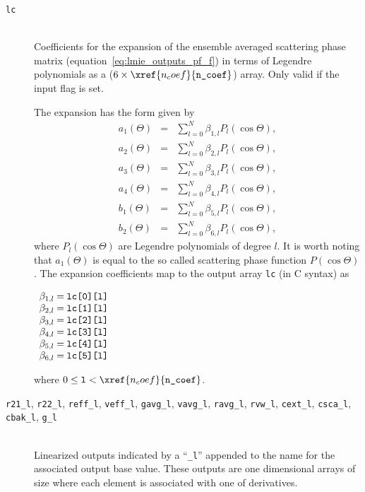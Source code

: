 \begin{description}
\item[\texttt{lc}] \hfill \\
Coefficients for the expansion of the ensemble averaged scattering phase matrix (equation~\ref{eq:lmie_outputs_pf_f}) in terms of Legendre polynomials as a ($6 \times \xref{n_coef}{\texttt{n\_coef}}$) array.  Only valid if the input flag  is set.

The expansion has the form given by
\begin{eqnarray*}
a_{1}(\Theta) &=& \sum^{N}_{l = 0} \beta_{1,l} P_{l}(\cos{\Theta}), \\
a_{2}(\Theta) &=& \sum^{N}_{l = 0} \beta_{2,l} P_{l}(\cos{\Theta}), \\
a_{3}(\Theta) &=& \sum^{N}_{l = 0} \beta_{3,l} P_{l}(\cos{\Theta}), \\
a_{4}(\Theta) &=& \sum^{N}_{l = 0} \beta_{4,l} P_{l}(\cos{\Theta}), \\
b_{1}(\Theta) &=& \sum^{N}_{l = 0} \beta_{5,l} P_{l}(\cos{\Theta}), \\
b_{2}(\Theta) &=& \sum^{N}_{l = 0} \beta_{6,l} P_{l}(\cos{\Theta}),
\end{eqnarray*}
where $P_{l}(\cos{\Theta})$ are Legendre polynomials of degree $l$.  It is worth noting that $a_{1}(\Theta)$ is equal to the so called scattering phase function $P(\cos{\Theta})$.  The expansion coefficients map to the output array \texttt{lc} (in C syntax) as 
\begin{indentall}
\(
\begin{array}{l@{\hspace{.25em}}c@{\hspace{.25em}}l}
\beta_{1,l} &=& \texttt{lc[0][l]} \\
\beta_{2,l} &=& \texttt{lc[1][l]} \\
\beta_{3,l} &=& \texttt{lc[2][l]} \\
\beta_{4,l} &=& \texttt{lc[3][l]} \\
\beta_{5,l} &=& \texttt{lc[4][l]} \\
\beta_{6,l} &=& \texttt{lc[5][l]}
\end{array}
\)
\end{indentall}
where $0 \le \texttt{l} < \xref{n_coef}{\texttt{n\_coef}}$.


\item[\texttt{r21\_l}, \texttt{r22\_l}, \texttt{reff\_l}, \texttt{veff\_l}, \texttt{gavg\_l}, \texttt{vavg\_l}, \texttt{ravg\_l}, \texttt{rvw\_l}, \texttt{cext\_l}, \texttt{csca\_l}, \texttt{cbak\_l}, \texttt{g\_l}] \hfill \\
Linearized outputs indicated by a ``\texttt{\_l}'' appended to the name for the associated output base value.  These outputs are one dimensional arrays of size  where each element is associated with one of  derivatives.


\end{description}
